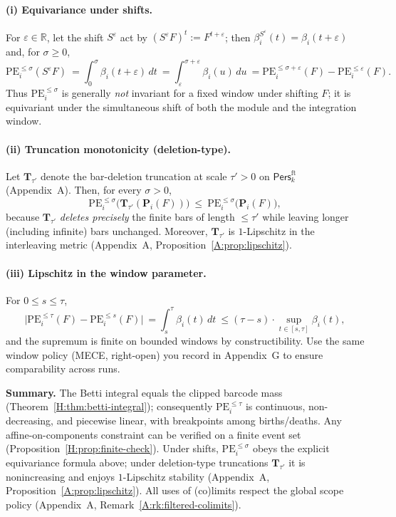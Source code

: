 \documentclass[11pt]{article}
\DeclareRobustCommand{\hyp}{\nobreakdash-}
\newcommand{\Pers}{\mathsf{Pers}}
\numberwithin{equation}{section}
\theoremstyle{definition}
\begin{document}
\paragraph{(i) Equivariance under shifts.}
For \(\varepsilon\in\mathbb{R}\), let the shift \(S^\varepsilon\) act by \((S^\varepsilon F)^t:=F^{t+\varepsilon}\); then \(\beta_i^{S^\varepsilon}(t)=\beta_i(t+\varepsilon)\) and, for \(\sigma\ge 0\),
\[
\mathrm{PE}_i^{\le \sigma}(S^\varepsilon F)\ =\int_{0}^{\sigma}\beta_i(t+\varepsilon)\,dt\ =\int_{\varepsilon}^{\sigma+\varepsilon}\beta_i(u)\,du\ =\mathrm{PE}_i^{\le \sigma+\varepsilon}(F)-\mathrm{PE}_i^{\le \varepsilon}(F).
\]
Thus \(\mathrm{PE}_i^{\le \sigma}\) is generally \emph{not} invariant for a fixed window under shifting \(F\); it is equivariant under the simultaneous shift of both the module and the integration window.

\paragraph{(ii) Truncation monotonicity (deletion-type).}
Let \(\mathbf{T}_{\tau'}\) denote the bar-deletion truncation at scale \(\tau'>0\) on \(\Pers^{\mathrm{ft}}_k\) (Appendix~A). Then, for every \(\sigma>0\),
\[
\mathrm{PE}_i^{\le \sigma}\!\big(\mathbf{T}_{\tau'}(\mathbf{P}_i(F))\big)\ \le\ \mathrm{PE}_i^{\le \sigma}\!\big(\mathbf{P}_i(F)\big),
\]
because \(\mathbf{T}_{\tau'}\) \emph{deletes precisely} the finite bars of length \(\le \tau'\) while leaving longer (including infinite) bars unchanged. Moreover, \(\mathbf{T}_{\tau'}\) is \(1\)-Lipschitz in the interleaving metric (Appendix~A, Proposition~\ref{A:prop:lipschitz}).

\paragraph{(iii) Lipschitz in the window parameter.}
For \(0\le s\le \tau\),
\[
\bigl|\mathrm{PE}_i^{\le \tau}(F)-\mathrm{PE}_i^{\le s}(F)\bigr|\ =\int_{s}^{\tau}\beta_i(t)\,dt\ \le (\tau-s)\cdot \sup_{t\in[s,\tau]}\beta_i(t),
\]
and the supremum is finite on bounded windows by constructibility. Use the same window policy (MECE, right-open) you record in Appendix~G to ensure comparability across runs.

\medskip
\noindent\textbf{Summary.}
The Betti integral equals the clipped barcode mass (Theorem~\ref{H:thm:betti-integral}); consequently \(\mathrm{PE}_i^{\le \tau}\) is continuous, non\hyp decreasing, and piecewise linear, with breakpoints among births/deaths. Any affine-on-components constraint can be verified on a finite event set (Proposition~\ref{H:prop:finite-check}). Under shifts, \(\mathrm{PE}_i^{\le \sigma}\) obeys the explicit equivariance formula above; under deletion-type truncations \(\mathbf{T}_{\tau'}\) it is nonincreasing and enjoys \(1\)-Lipschitz stability (Appendix~A, Proposition~\ref{A:prop:lipschitz}). All uses of (co)limits respect the global scope policy (Appendix~A, Remark~\ref{A:rk:filtered-colimits}).
\end{document}
